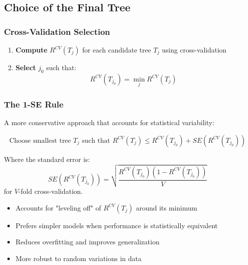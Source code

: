 \documentclass[12pt,a4paper]{article}
\begin{document}
\subsection{Choice of the Final Tree}

\subsubsection{Cross-Validation Selection}

\begin{enumerate}
    \item \textbf{Compute} $R^{CV}(T_j)$ for each candidate tree $T_j$ using cross-validation
    \item \textbf{Select} $j_0$ such that:
   \begin{equation}
   R^{CV}(T_{j_0}) = \min_j R^{CV}(T_j)
   \end{equation}
\end{enumerate}

\subsubsection{The 1-SE Rule}

A more conservative approach that accounts for statistical variability:

\begin{equation}
\text{Choose smallest tree } T_j \text{ such that } R^{CV}(T_j) \leq R^{CV}(T_{j_0}) + SE(R^{CV}(T_{j_0}))
\end{equation}

Where the standard error is:
\begin{equation}
SE(R^{CV}(T_{j_0})) = \sqrt{\frac{R^{CV}(T_{j_0})(1 - R^{CV}(T_{j_0}))}{V}}
\end{equation}
for $V$-fold cross-validation.

\begin{tcolorbox}[colback=red!5!white,colframe=red!75!black,title=1-SE Rule Rationale]
\begin{itemize}
    \item Accounts for "leveling off" of $R^{CV}(T_j)$ around its minimum
    \item Prefers simpler models when performance is statistically equivalent
    \item Reduces overfitting and improves generalization
    \item More robust to random variations in data
\end{itemize}
\end{tcolorbox}
\end{document}
